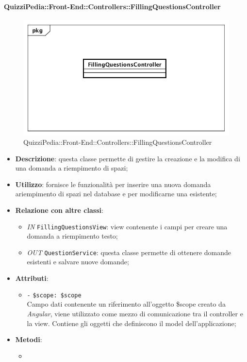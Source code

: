\paragraph{QuizziPedia::Front-End::Controllers::FillingQuestionsController}
\begin{figure} [ht]
	\centering
	\includegraphics[scale=0.45]{UML/Classi/Front-End/QuizziPedia_Front-end_Controller_FillingQuestionsController.png}
	\caption{QuizziPedia::Front-End::Controllers::FillingQuestionsController}
\end{figure} \FloatBarrier
\begin{itemize}
	\item \textbf{Descrizione}: questa classe permette di gestire la creazione e la modifica di una domanda a riempimento di spazi;
	\item \textbf{Utilizzo}: fornisce le funzionalità per inserire una nuova domanda ariempimento di spazi nel database e per modificarne una esistente;
	\item \textbf{Relazione con altre classi}:
	\begin{itemize}
		\item \textit{IN} \texttt{FillingQuestionsView}: view contenente i campi per creare una domanda a riempimento testo; 
		\item \textit{OUT} \texttt{QuestionService}: questa classe permette di ottenere domande esistenti e salvare nuove domande;
	\end{itemize}
	\item \textbf{Attributi}:
	\begin{itemize}
		\item \texttt{-} \texttt{\$scope: \$scope} \\
		Campo dati contenente un riferimento all’oggetto \$scope creato da \textit{Angular}, viene utilizzato come mezzo di comunicazione tra il controller e la view. Contiene gli oggetti che definiscono il model dell’applicazione;
	\end{itemize}
	\item \textbf{Metodi}:
	\begin{itemize}
		\item 
	\end{itemize}
\end{itemize}

